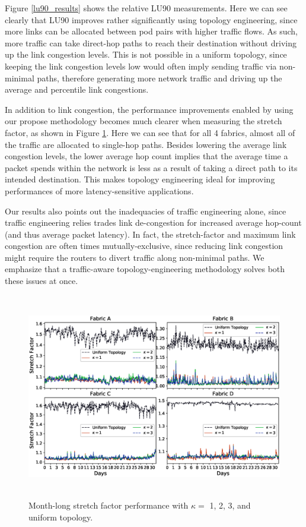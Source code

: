 \documentclass[sigconf]{acmart}
\theoremstyle{definition}
\begin{document}
Figure \ref{lu90_results} shows the relative LU90 measurements. Here we can see clearly that LU90 improves rather significantly using topology engineering, since more links can be allocated between pod pairs with higher traffic flows. As such, more traffic can take direct-hop paths to reach their destination without driving up the link congestion levels. This is not possible in a uniform topology, since keeping the link congestion levels low would often imply sending traffic via non-minimal paths, therefore generating more network traffic and driving up the average and percentile link congestions.

In addition to link congestion, the performance improvements enabled by using our propose methodology becomes much clearer when measuring the stretch factor, as shown in Figure \ref{stretch_factor_results}. Here we can see that for all 4 fabrics, almost all of the traffic are allocated to single-hop paths. Besides lowering the average link congestion levels, the lower average hop count implies that the average time a packet spends within the network is less as a result of taking a direct path to its intended destination. This makes topology engineering ideal for improving performances of more latency-sensitive applications. 

Our results also points out the inadequacies of traffic engineering alone, since traffic engineering relies trades link de-congestion for increased average hop-count (and thus average packet latency). In fact, the stretch-factor and maximum link congestion are often times mutually-exclusive, since reducing link congestion might require the routers to divert traffic along non-minimal paths. We emphasize that a traffic-aware topology-engineering methodology solves both these issues at once.


\begin{figure}[ht]
\centering
\includegraphics[scale=1.2, width=1.03\textwidth, height=9cm, trim={2cm 1.9cm 0cm 0.6cm}]{figures/stretch_factor.eps}
\caption{Month-long stretch factor performance with $\kappa = $ 1, 2, 3, and uniform topology.}
\label{stretch_factor_results}
\end{figure}
\end{document}

